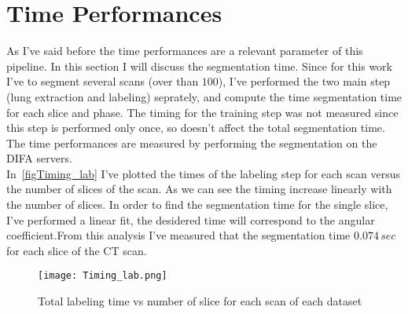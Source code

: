 \documentclass{standalone}
\begin{document}
	\section{Time Performances}
	As I've said before the time performances are a relevant parameter of this pipeline. In this section I will discuss the segmentation time.  Since for this work I've to segment several scans (over than $100$), I've performed the  two main step (lung extraction and labeling) seprately, and compute the time segmentation time for each slice and phase. The timing for the training step was not measured since this step is performed only once, so doesn't affect the total segmentation time.\\
	The time performances are measured by performing the segmentation on the DIFA servers.\\
	
	In \figurename\,\ref{figTiming_lab} I've plotted the times of the labeling  step for each scan versus the number of slices of the scan. As we can see the timing increase linearly with the number of slices. In order to find the segmentation time for the single slice, I've performed a linear fit, the desidered time will correspond to the angular coefficient.From this analysis I've measured that the segmentation time $0.074\,sec$ for each slice of the CT scan. 
	\begin{figure}[h!]
		\centering
		\texttt{[image: Timing\_lab.png]}
		\caption{Total labeling time vs number of slice for each scan of each dataset}	\label{fig:Timing_lab}
		
	\end{figure}
	
\end{document}
